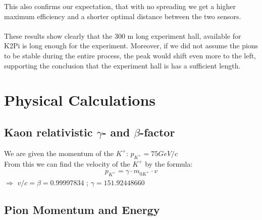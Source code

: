 \documentclass[a4paper,parskip,11pt, DIV12]{scrreprt}
\begin{document}
	This also confirms our expectation, that with no spreading we get a higher maximum efficiency and a shorter optimal distance between the two sensors.
	\\
	\\
	These results show clearly that the 300 m long experiment hall, available for K2Pi is long enough for the experiment. Moreover, if we did not assume the pions to be stable during the entire process, the peak would shift even more to the left, supporting the conclusion that the experiment hall is has a sufficient length.
	\clearpage
	
	\chapter{Physical Calculations}
	
	\section{Kaon relativistic $\gamma$- and $\beta$-factor} \label{sec:gammabeta}
	
	We are given the momentum of the $K^+$: $p_{K^+} = 75 GeV/c$\\
	From this we can find the velocity of the $K^+$ by the formula:
	\begin{align*}
	p_{K^+} = \gamma \cdot m_{0K^+} \cdot v
	\end{align*}
	$\Rightarrow$
	$v/c = \beta = 0.99997834$ ;
	$\gamma = 151.92448660$\\
	
	\section{Pion Momentum and Energy} \label{sec:pE}
	
\end{document}

